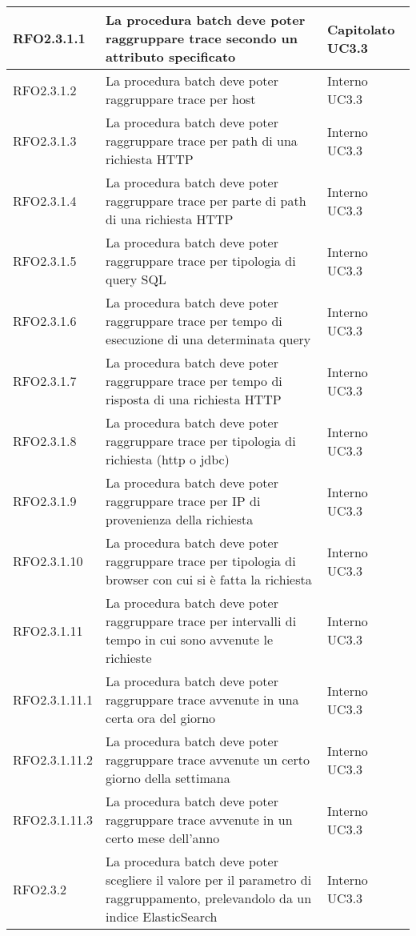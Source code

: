 \begin{center}
\begin{longtable}{ | >{\centering\arraybackslash}m{2.5cm} | >{\centering\arraybackslash}m{8cm} | >{\centering\arraybackslash}m{2.5cm} | }
        RFO2.3.1.1 & La procedura batch deve poter raggruppare trace secondo un attributo specificato & Capitolato UC3.3\\ \hline
        RFO2.3.1.2 & La procedura batch deve poter raggruppare trace per host & Interno UC3.3\\ \hline
        RFO2.3.1.3 & La procedura batch deve poter raggruppare trace per path di una richiesta HTTP & Interno UC3.3\\ \hline
        RFO2.3.1.4 & La procedura batch deve poter raggruppare trace per parte di path di una richiesta HTTP & Interno UC3.3\\ \hline
        RFO2.3.1.5 & La procedura batch deve poter raggruppare trace per tipologia di query SQL & Interno UC3.3\\ \hline
        RFO2.3.1.6 & La procedura batch deve poter raggruppare trace per tempo di esecuzione di una determinata query & Interno UC3.3\\ \hline
        RFO2.3.1.7 & La procedura batch deve poter raggruppare trace per tempo di risposta di una richiesta HTTP & Interno UC3.3\\ \hline
        RFO2.3.1.8 & La procedura batch deve poter raggruppare trace per tipologia di richiesta (http o jdbc) & Interno UC3.3\\ \hline
        RFO2.3.1.9 & La procedura batch deve poter raggruppare trace per IP di provenienza della richiesta & Interno UC3.3\\ \hline
        RFO2.3.1.10 & La procedura batch deve poter raggruppare trace per tipologia di browser con cui si è fatta la richiesta & Interno UC3.3\\ \hline
        RFO2.3.1.11 & La procedura batch deve poter raggruppare trace per intervalli di tempo in cui sono avvenute le richieste & Interno UC3.3\\ \hline
        RFO2.3.1.11.1 & La procedura batch deve poter raggruppare trace avvenute in una certa ora del giorno & Interno UC3.3\\ \hline
        RFO2.3.1.11.2 & La procedura batch deve poter raggruppare trace avvenute un certo giorno della settimana & Interno UC3.3\\ \hline
        RFO2.3.1.11.3 & La procedura batch deve poter raggruppare trace avvenute in un certo mese dell'anno & Interno UC3.3\\ \hline
        RFO2.3.2 & La procedura batch deve poter scegliere il valore per il parametro di raggruppamento, prelevandolo da un indice ElasticSearch & Interno UC3.3\\ \hline

\end{longtable}
\end{center}
